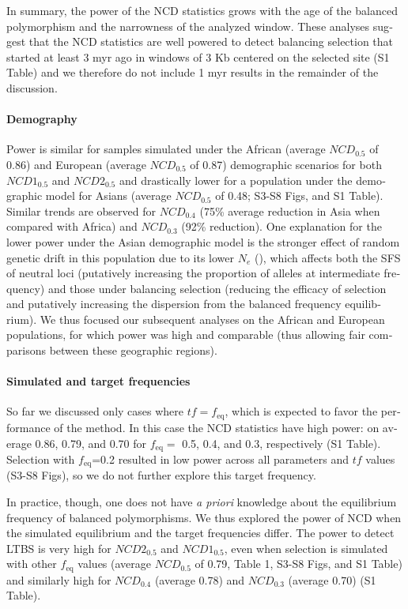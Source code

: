 \begin{refsection}
\begin{otherlanguage}{english}
In summary, the power of the NCD statistics grows with the age of the balanced polymorphism and the narrowness of the analyzed window. These analyses suggest that the NCD statistics are well powered to detect balancing selection that started at least 3 myr ago in windows of 3 Kb centered on the selected site (S1 Table) and we therefore do not include 1 myr results in the remainder of the discussion.

\paragraph{Demography} Power is similar for samples simulated under the African (average $NCD_{0.5}$ of 0.86) and European (average $NCD_{0.5}$ of 0.87) demographic scenarios for both $NCD1_{0.5}$ and $NCD2_{0.5}$ and drastically lower for a population under the demographic model for Asians (average $NCD_{0.5}$ of 0.48; S3-S8 Figs, and S1 Table). Similar trends are observed for $NCD_{0.4}$ (75\% average reduction in Asia when compared with Africa) and $NCD_{0.3}$ (92\% reduction). One explanation for the lower power under the Asian demographic model is the stronger effect of random genetic drift in this population due to its lower $N_{e}$ (\cite{Gutenkunst2009,Gravel2011}), which affects both the SFS of neutral loci (putatively increasing the proportion of alleles at intermediate frequency) and those under balancing selection (reducing the efficacy of selection and putatively increasing the dispersion from the balanced frequency equilibrium). We thus focused our subsequent analyses on the African and European populations, for which power was high and comparable (thus allowing fair comparisons between these geographic regions).

\paragraph{Simulated and target frequencies} So far we discussed only cases where $tf=f_{\mathrm{eq}}$, which is expected to favor the performance of the method. In this case the NCD statistics have high power: on average 0.86, 0.79, and 0.70 for $f_{\mathrm{eq}}=$ 0.5, 0.4, and 0.3, respectively (S1 Table). Selection with $f_{\mathrm{eq}}$=0.2 resulted in low power across all parameters and $tf$ values (S3-S8 Figs), so we do not further explore this target frequency. 

In practice, though, one does not have \emph{a priori} knowledge about the equilibrium frequency of balanced polymorphisms. We thus explored the power of NCD when the simulated equilibrium and the target frequencies differ. The power to detect LTBS is very high for $NCD2_{0.5}$ and $NCD1_{0.5}$, even when selection is simulated with other $f_{\mathrm{eq}}$ values (average $NCD_{0.5}$  of 0.79, Table 1, S3-S8 Figs, and S1 Table) and similarly high for $NCD_{0.4}$ (average 0.78) and $NCD_{0.3}$ (average 0.70) (S1 Table). 


\end{otherlanguage}
\end{refsection}
